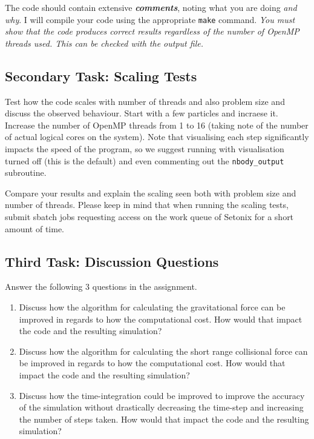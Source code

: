 \documentclass[11pt]{amsart}
\begin{document}
The code should contain extensive \textbf{\textit{comments}}, noting what you are doing \textit{and why}. I will compile your code using the appropriate \texttt{make} command.
{\centering \textit{You must show that the code produces correct results regardless of the number of OpenMP threads used. This can be checked with the output file.}}

\subsection{{\color{Red}Secondary Task}: Scaling Tests\nopunct\\}\label{sec:tasks:scaling}
Test how the code scales with number of threads and also problem size and discuss the observed behaviour. Start with a few particles and incraese it. Increase the number of OpenMP threads from 1 to 16 (taking note of the number of actual logical cores on the system). Note that visualising each step significantly impacts the speed of the program, so we suggest running with visualisation turned off (this is the default) and even commenting out the \texttt{nbody\_output} subroutine.

\par 
Compare your results and explain the scaling seen both with problem size and number of threads. Please keep in mind that when running the scaling tests, submit sbatch jobs requesting access on the work queue of Setonix for a short amount of time.

\subsection{{\color{Red}Third Task}: Discussion Questions\nopunct\\}\label{sec:tasks:discussion}
Answer the following 3 questions in the assignment.
\begin{enumerate} 
  \item Discuss how the algorithm for calculating the gravitational force can be improved in regards to how the computational cost. How would that impact the code and the resulting simulation?
  \item Discuss how the algorithm for calculating the short range collisional force can be improved in regards to how the computational cost. How would that impact the code and the resulting simulation?
  \item Discuss how the time-integration could be improved to improve the accuracy of the simulation without drastically decreasing the time-step and increasing the number of steps taken. How would that impact the code and the resulting simulation? 
\end{enumerate}
\end{document}
